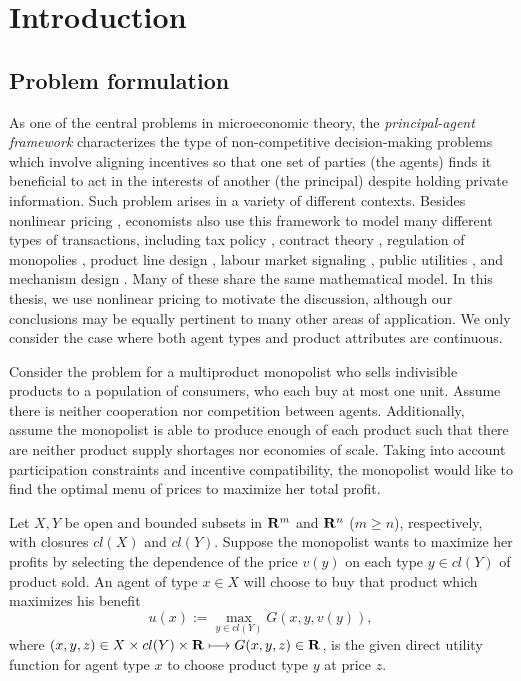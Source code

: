 \chapter{Introduction}\label{chapter: introduction}

\section{Problem formulation}

As one of the central problems in microeconomic theory, the {\em principal-agent framework} characterizes the type of non-competitive decision-making problems which involve aligning incentives so that one set of parties (the agents) finds it beneficial to act in the interests of another (the principal) despite holding private information.
Such problem arises in a variety of different contexts. Besides nonlinear pricing \cite{Armstrong96,MussaRosen78,Spence80,Wilson93}, economists also use this framework to model many different types of transactions, including tax policy \cite{GuesnerieLaffont78,Mirrlees71,Rochet85}, contract theory \cite{QuinziiRochet85}, regulation of monopolies \cite{BaronMyerson82}, product line design \cite{RochetChone98}, labour market signaling \cite{Spence74}, public utilities \cite{Roberts79}, and mechanism design \cite{
KadanRenySwinkels11, MaskinRiley84, McAfeeMcMillan88, MonteiroPage98, Myerson81, Vohra11}. Many of these share the same mathematical model.
In this thesis, we use nonlinear pricing to motivate the discussion, although our conclusions may be equally pertinent to many other areas of application. We only consider the case where both agent types and product attributes are continuous.\medskip

Consider the problem for a multiproduct monopolist who sells indivisible products to a population of consumers, who each buy at most one unit. Assume there is neither cooperation nor competition between agents. Additionally, assume the monopolist is able to produce enough of each product such that there are neither product supply shortages {nor economies of scale}. Taking into account participation constraints and incentive compatibility, the monopolist would like to find the optimal menu of prices to maximize her total profit.\medskip

Let $X,Y$ be open and bounded subsets in ${\mathbf R}^m$ and ${\mathbf R}^n$ ($m \ge n$), respectively,
with closures $cl(X)$ and $cl(Y)$. Suppose the monopolist wants to maximize her profits by selecting the dependence of the price $v(y)$ on each type  $y \in cl(Y)$ of product sold. An agent of type $x \in X$ will choose to buy that product which maximizes his benefit 
\begin{equation}\label{1}
u (x) := \max_{y \in cl(Y)} G(x, y, v(y)),
\end{equation}
where $(x, y, z)\in X \times cl(Y)\times {\mathbf R} \longmapsto G(x,y,z) \in {\mathbf R}$, is the given direct utility function for agent type $x$ to choose product type $y$ at price $z$.\medskip

